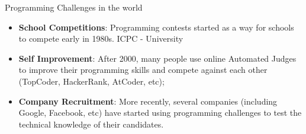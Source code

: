 \begin{frame}{Programming Challenges in the world}
  \begin{itemize}
    \item {\bf School Competitions}: Programming contests started as a way for schools to compete early in 1980s. ICPC - University
    \bigskip

    \item {\bf Self Improvement}: After 2000, many people use online Automated Judges to improve their programming skills and compete against each other (TopCoder, HackerRank, AtCoder, etc);
    \bigskip

    \item {\bf Company Recruitment}: More recently, several companies (including Google, Facebook, etc) have started using programming challenges to test the technical knowledge of their candidates.
  \end{itemize}
\end{frame}


